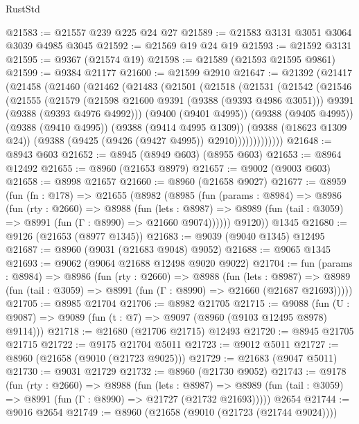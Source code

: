 \begin{lexlean}{RustStd}
\begin{coremodule}
@21583 := @21557 @239 @225 @24 @27
@21589 := @21583 @3131 @3051 @3064 @3039 @4985 @3045
@21592 := @21569 @19 @24 @19
@21593 := @21592 @3131
@21595 := @9367 (@21574 @19)
@21598 := @21589 (@21593 @21595 @9861)
@21599 := @9384 @21177
@21600 := @21599 @2910
@21647 := @21392
    (@21417
      (@21458
        (@21460
          (@21462
            (@21483
              (@21501
                (@21518
                  (@21531
                    (@21542
                      (@21546
                        (@21555
                          (@21579
                            (@21598 @21600 @9391 (@9388 (@9393 @4986 @3051)))
                            @9391
                            (@9388 (@9393 @4976 @4992)))
                          (@9400 (@9401 @4995))
                          (@9388 (@9405 @4995))
                          (@9388 (@9410 @4995))
                          (@9388 (@9414 @4995 @1309))
                          (@9388 (@18623 @1309 @24))
                          (@9388 (@9425 (@9426 (@9427 @4995)) @2910)))))))))))))
@21648 := @8943 @603
@21652 := @8945 (@8949 @603) (@8955 @603)
@21653 := @8964 @12492
@21655 := @8960 (@21653 @8979)
@21657 := @9002 (@9003 @603)
@21658 := @8998 @21657
@21660 := @8960 (@21658 @9027)
@21677 := @8959
    (fun (fn : @178) =>
    @21655
      (@8982
        (@8985
          (fun (params : @8984) =>
          @8986
            (fun (rty : @2660) =>
            @8988
              (fun (lets : @8987) =>
              @8989 (fun (tail : @3059) => @8991 (fun (Γ : @8990) => @21660 @9074))))))
        @9120))
    @1345
@21680 := @9126 (@21653 (@8977 @1345))
@21683 := @9039 (@9040 @1345) @12495
@21687 := @8960 (@9031 (@21683 @9048) @9052)
@21688 := @9065 @1345
@21693 := @9062 (@9064 @21688 @12498 @9020 @9022)
@21704 := fun (params : @8984) =>
  @8986
    (fun (rty : @2660) =>
    @8988
      (fun (lets : @8987) =>
      @8989 (fun (tail : @3059) => @8991 (fun (Γ : @8990) => @21660 (@21687 @21693)))))
@21705 := @8985 @21704
@21706 := @8982 @21705
@21715 := @9088
    (fun (U : @9087) => @9089 (fun (t : @7) => @9097 (@8960 (@9103 @12495 @8978) @9114)))
@21718 := @21680 (@21706 @21715) @12493
@21720 := @8945 @21705 @21715
@21722 := @9175 @21704 @5011
@21723 := @9012 @5011
@21727 := @8960 (@21658 (@9010 (@21723 @9025)))
@21729 := @21683 (@9047 @5011)
@21730 := @9031 @21729
@21732 := @8960 (@21730 @9052)
@21743 := @9178
    (fun (rty : @2660) =>
    @8988
      (fun (lets : @8987) =>
      @8989 (fun (tail : @3059) => @8991 (fun (Γ : @8990) => @21727 (@21732 @21693)))))
    @2654
@21744 := @9016 @2654
@21749 := @8960 (@21658 (@9010 (@21723 (@21744 @9024))))

\end{coremodule}
\end{lexlean}
